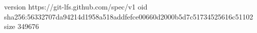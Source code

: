 version https://git-lfs.github.com/spec/v1
oid sha256:56332707da94214d1958a518addfefce00660d2000b5d7c51734525616c51102
size 349676
